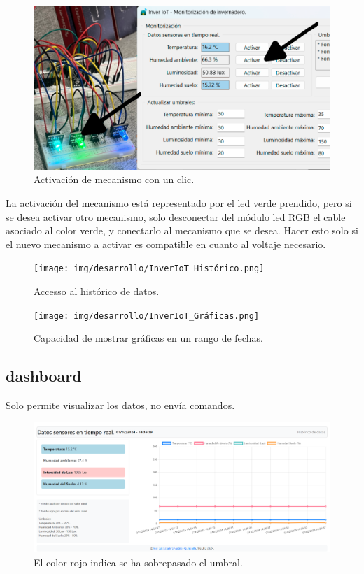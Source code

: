 \begin{figure}[h]
\centering
\includegraphics[width=1\textwidth]{img/desarrollo/InverIoT_verde_clickMecanismo.png}
\caption{Activación de mecanismo con un clic.}
\end{figure}

La activación del mecanismo está representado por el led verde prendido, pero si se desea activar otro mecanismo, solo desconectar del módulo led RGB el cable asociado al color verde, y conectarlo al mecanismo que se desea. Hacer esto solo si el nuevo mecanismo a activar es compatible en cuanto al voltaje necesario.


\begin{figure}[h]
\centering
\texttt{[image: img/desarrollo/InverIoT\_Histórico.png]}
\caption{Accesso al histórico de datos.}
\end{figure}

\begin{figure}[h]
\centering
\texttt{[image: img/desarrollo/InverIoT\_Gráficas.png]}
\caption{Capacidad de mostrar gráficas en un rango de fechas.}
\end{figure}

\subsection{dashboard}
Solo permite visualizar los datos, no envía comandos.

\begin{figure}[h]
\centering
\includegraphics[width=1\textwidth]{img/desarrollo/Dashboard1.png}
\caption{El color rojo indica se ha sobrepasado el umbral.}
\end{figure}

